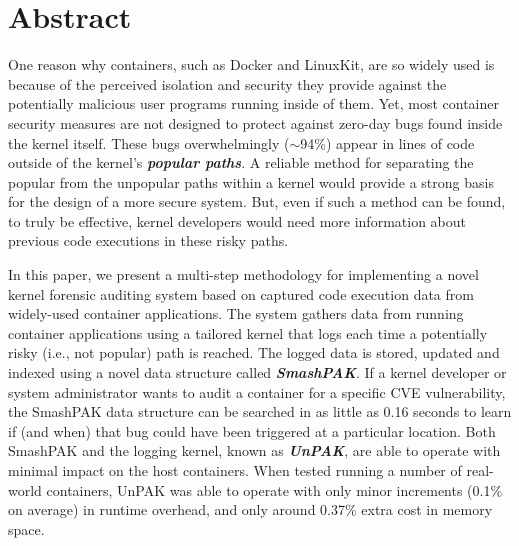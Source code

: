 \section*{Abstract}
One reason why containers, such as Docker and LinuxKit, are so widely used is because of the perceived isolation 
and security they provide against the potentially malicious user programs running inside of them. 
Yet, most container security measures are not designed to protect against zero-day bugs found inside the kernel itself. 
These bugs overwhelmingly ($\sim$94\%) appear in lines of code outside of the kernel’s \textbf{\textit{popular paths}}. 
A reliable method for separating the popular from the unpopular paths within a kernel would provide a strong basis for the design of a more secure system. 
But, even if such a method can be found,  to truly be effective, kernel developers would need more information about previous code executions in these risky paths.

In this paper, we present a multi-step methodology for implementing a novel kernel forensic auditing system based on captured code execution data from widely-used container applications.  
The system gathers data from running container applications using a tailored kernel that logs each time a potentially risky (i.e., not popular) path is reached. 
The logged data is stored, updated and indexed using a novel data structure called \textbf{\textit{SmashPAK}}. 
If a kernel developer or system administrator wants to audit a container for a specific CVE vulnerability, 
the SmashPAK data structure can be searched in as little as 0.16 seconds to learn if (and when) that bug could have been triggered at a particular location. 
Both SmashPAK and the logging kernel, known as \textbf{\textit{UnPAK}}, are able to operate with minimal impact on the host containers. 
When tested running a number of real-world containers, UnPAK was able to operate with only minor increments (0.1\% on average) in runtime overhead, and only around 0.37\% extra cost in memory space.
